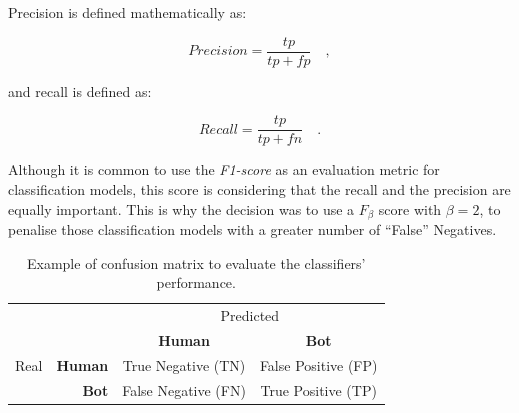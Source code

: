 \documentclass[a4paper, 12pt]{book}
\begin{document}
Precision is defined mathematically as:

\begin{center}
\begin{equation}
Precision = \frac{tp}{tp+fp} \quad,
\end{equation}
\end{center}

and recall is defined as: 

\begin{center}
\begin{equation}
Recall = \frac{tp}{tp+fn} \quad.
\end{equation}
\end{center}

Although it is common to use the \emph{F1-score} as an evaluation metric for classification models, this score is considering that the recall and the precision are equally important. This is why the decision was to use a \emph{$F_{\beta}$} score with $\beta = 2$, to penalise those classification models with a greater number of ``False'' Negatives.

\begin{table}[tb]
\renewcommand{\arraystretch}{1.5}
\begin{center}
\begin{tabular}{ l r c c }
\toprule
      &                & \multicolumn{2}{c}{Predicted} \tabularnewline
      &                & \textbf{Human}                              & \textbf{Bot} \\
                         
 Real & \textbf{Human} & \cellcolor[HTML]{67FD9A}True Negative (TN)  & \cellcolor[HTML]{FD6864}False Positive (FP) \\ %
      & \textbf{Bot}   & \cellcolor[HTML]{FD6864}False Negative (FN) & \cellcolor[HTML]{67FD9A}True Positive (TP) \\ %
\bottomrule
\end{tabular}
\caption{Example of confusion matrix to evaluate the classifiers' performance.}
\label{table:example-confusion-matrix}
\end{center}
\end{table}

\cleardoublepage

\end{document}
